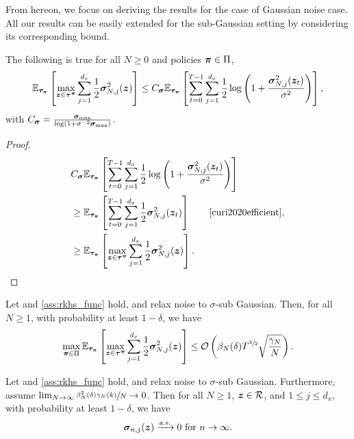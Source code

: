   From hereon, we focus on deriving the results for the case of Gaussian noise case. All our results can be easily extended for the sub-Gaussian setting by considering its corresponding bound.
   \begin{lemma}
       The following is true for all $N \geq 0$ and policies ${\bm{\pi}} \in \Pi$,
       \begin{equation*}
           \mathbb{E}_{{\bm{\tau}}_{{\bm{\pi}}}}\left[ \max_{{\bm{z}} \in {\bm{\tau}}^{{\bm{\pi}}}}\sum^{d_x}_{j=1} \frac{1}{2}{\bm{\sigma}}_{N, j}^2({\bm{z}}) \right] \leq C_{{\bm{\sigma}}} \mathbb{E}_{{\bm{\tau}}_{{\bm{\pi}}}}\left[\sum_{t=0}^{T-1} \sum^{d_x}_{j=1}\frac{1}{2} \log \left(1 + \frac{{\bm{\sigma}}_{N, j}^2({\bm{z}}_{ t})}{\sigma^2}\right)\right],
       \end{equation*}
       with $C_{{\bm{\sigma}}} = \frac{{\bm{\sigma}}_{\max}}{\log(1 + \sigma^{-2}{\bm{\sigma}}_{\max})}$.
   \end{lemma}
\begin{proof}
\begin{align*}
&C_{\vsigma} \E_{\vtau_{\vpi}}\left[\sum_{t=0}^{T-1} \sum^{d_x}_{j=1}\frac{1}{2} \log \left(1 + \frac{\vsigma_{N, j}^2(\vz_{ t})}{\sigma^2}\right)\right] \\
&\geq  \E_{\vtau_{\vpi}}\left[ \sum_{t=0}^{T-1} \sum^{d_x}_{j=1} \frac{1}{2}\vsigma_{N, j}^2(\vz_{t}) \right] \tag*{\cite[Lemma.~15]{curi2020efficient}}, \\ 
&\geq \E_{\vtau_{\vpi}}\left[ \max_{\vz \in \vtau^{\vpi}}\sum^{d_x}_{j=1} \frac{1}{2}\vsigma_{N, j}^2(\vz) \right].
\end{align*}
\end{proof}
\begin{corollary}
    Let  and \ref{ass:rkhs_func} hold, and relax noise  to $\sigma$-sub Gaussian. 
Then, for all $N \geq 1$, with probability at least $1-\delta$, we have
\begin{equation*}
    \max_{{\bm{\pi}} \in \Pi} \mathbb{E}_{{\bm{\tau}}_{{\bm{\pi}}}}\left[ \max_{{\bm{z}} \in {\bm{\tau}}^{{\bm{\pi}}}}\sum^{d_x}_{j=1} \frac{1}{2}{\bm{\sigma}}_{N, j}^2({\bm{z}}) \right] \leq {\mathcal{O}} \left(\beta_{N}(\delta) T^{\sfrac{3}{2}}\sqrt{\frac{\gamma_N}{N}}\right).
\end{equation*}
\label{cor:max_uncertainty_bound}
\end{corollary}
\begin{lemma}
     Let  and \ref{ass:rkhs_func} hold, and relax noise  to $\sigma$-sub Gaussian. Furthermore, assume $\lim_{N\to \infty} \sfrac{\beta_N^2(\delta)\gamma_N(k)}{N} \to 0$. Then for all $N \geq 1$, ${\bm{z}} \in {\mathcal{R}}$, and $1 \leq j \leq d_x$, with probability at least $1-\delta$, we have
     \begin{equation*}
         {\bm{\sigma}}_{n, j}({\bm{z}}) \xrightarrow[]{\mathrm{a.s.}} 0 \text{ for } n \to \infty.
     \end{equation*}
     \label{lem:as_convergence_lemma}
\end{lemma}
